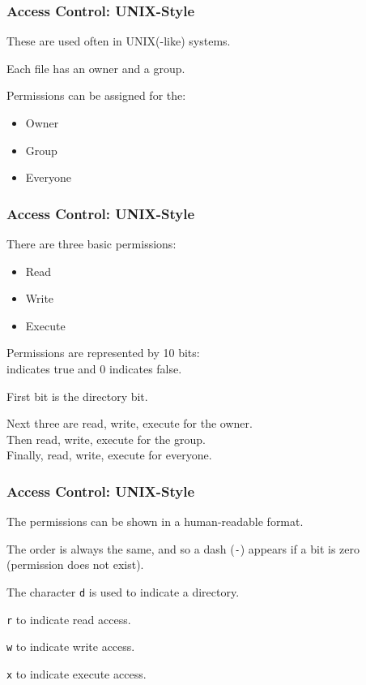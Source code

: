 \begin{frame}
\frametitle{Access Control: UNIX-Style}

These are used often in UNIX(-like) systems.

Each file has an owner and a group. 

Permissions can be assigned for the:
\begin{itemize}
	\item Owner
	\item Group
	\item Everyone
\end{itemize}


\end{frame}

\begin{frame}
\frametitle{Access Control: UNIX-Style}


There are three basic permissions: 

\begin{itemize}
	\item Read
	\item Write
	\item Execute
\end{itemize}

Permissions are represented by 10 bits:\\ 
 indicates true and 0 indicates false.

First bit is the directory bit.

Next three are read, write, execute for the owner.\\
Then read, write, execute for the group.\\
Finally, read, write, execute for everyone.


\end{frame}

\begin{frame}
\frametitle{Access Control: UNIX-Style}


The permissions can be shown in a human-readable format.

The order is always the same, and so a dash (\texttt{-}) appears if a bit is zero (permission does not exist). 

The character \texttt{d} is used to indicate a directory.

\texttt{r} to indicate read access.

\texttt{w} to indicate write access.

\texttt{x} to indicate execute access.



\end{frame}

